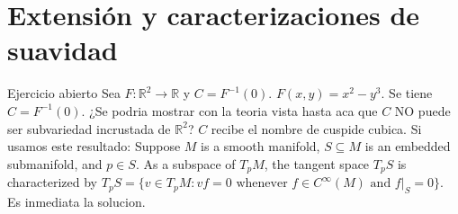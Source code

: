 \chapter{Extensión y caracterizaciones de suavidad}
\label{ch:teo-14}
\begin{bookexample}{Ejercicio abierto}
Sea $F:\mathbb R^2\to\mathbb R$ y $C=F^{-1}(0)$. $F(x,y)=x^2-y^3$. Se tiene $C=F^{-1}(0)$. ¿Se podria mostrar con la teoria vista hasta aca que $C$ NO puede ser subvariedad incrustada de $\mathbb R^2$? $C$ recibe el nombre de cuspide cubica. Si usamos este resultado: Suppose $M$ is a smooth manifold, $S\subseteq M$ is an embedded submanifold, and $p\in S$. As a subspace of $T_pM$, the tangent space $T_pS$ is characterized by $T_pS=\{v\in T_pM:vf=0\text{ whenever }f\in C^\infty(M)\text{ and }f|_S=0\}$. Es inmediata la solucion.

\end{bookexample}
